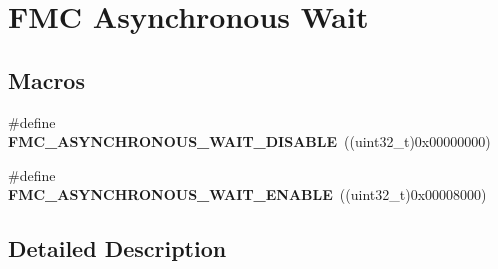 \hypertarget{group___f_m_c___asynchronous_wait}{}\section{F\+MC Asynchronous Wait}
\label{group___f_m_c___asynchronous_wait}
\subsection*{Macros}
\begin{DoxyCompactItemize}
\item 
\#define {\bfseries F\+M\+C\+\_\+\+A\+S\+Y\+N\+C\+H\+R\+O\+N\+O\+U\+S\+\_\+\+W\+A\+I\+T\+\_\+\+D\+I\+S\+A\+B\+LE}~((uint32\+\_\+t)0x00000000)\hypertarget{group___f_m_c___asynchronous_wait_ga1aa2d6b730db6e64217a0b1873af113e}{}\label{group___f_m_c___asynchronous_wait_ga1aa2d6b730db6e64217a0b1873af113e}

\item 
\#define {\bfseries F\+M\+C\+\_\+\+A\+S\+Y\+N\+C\+H\+R\+O\+N\+O\+U\+S\+\_\+\+W\+A\+I\+T\+\_\+\+E\+N\+A\+B\+LE}~((uint32\+\_\+t)0x00008000)\hypertarget{group___f_m_c___asynchronous_wait_gaa96144188a5b15be4095c33952c6371d}{}\label{group___f_m_c___asynchronous_wait_gaa96144188a5b15be4095c33952c6371d}

\end{DoxyCompactItemize}


\subsection{Detailed Description}
